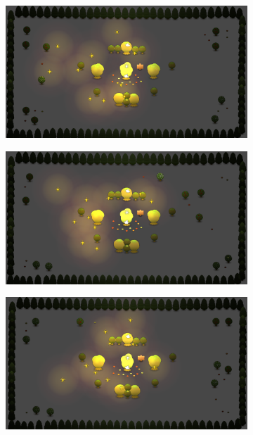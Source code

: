\begin{figure}[h]
        \centering
        \begin{subfigure}[b]{0.48\linewidth}
                \includegraphics[width=\linewidth]{./ga_outcome_1}
                \caption{}
                \label{fig:ga_outcome_1}
        \end{subfigure}
        \begin{subfigure}[b]{0.48\linewidth}
                \includegraphics[width=\linewidth]{./ga_outcome_2}
                \caption{}
                \label{fig:ga_outcome_2}
        \end{subfigure}
        \begin{subfigure}[b]{0.48\linewidth}
                \includegraphics[width=\linewidth]{./ga_outcome_3}

\end{subfigure}
\end{figure}
